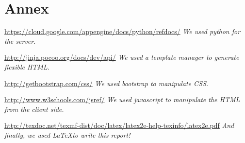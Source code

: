 \section*{Annex}

\url{https://cloud.google.com/appengine/docs/python/refdocs/} \linebreak
\emph{We used python for the server.}

\url{http://jinja.pocoo.org/docs/dev/api/} \linebreak
\emph{We used a template manager to generate flexible HTML.}

\url{http://getbootstrap.com/css/} \linebreak
\emph{We used bootstrap to manipulate CSS.}

\url{http://www.w3schools.com/jsref/} \linebreak
\emph{We used javascript to manipulate the HTML from the client side.}

\url{http://texdoc.net/texmf-dist/doc/latex/latex2e-help-texinfo/latex2e.pdf} \linebreak
\emph{And finally, we used \LaTeX to write this report!} 
